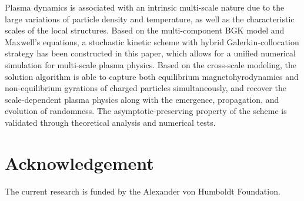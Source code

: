 \documentclass[preprint,3p,12pt,sort&compress]{elsarticle}
\begin{document}
Plasma dynamics is associated with an intrinsic multi-scale nature due to the large variations of particle density and temperature, as well as the characteristic scales of the local structures. 
Based on the multi-component BGK model and Maxwell's equations, a stochastic kinetic scheme with hybrid Galerkin-collocation strategy has been constructed in this paper, which allows for a unified numerical simulation for multi-scale plasma physics. 
Based on the cross-scale modeling, the solution algorithm is able to capture both equilibrium magnetohyrodynamics and non-equilibrium gyrations of charged particles simultaneously, and recover the scale-dependent plasma physics along with the emergence, propagation, and evolution of randomness. 
The asymptotic-preserving property of the scheme is validated through theoretical analysis and numerical tests.

\section*{Acknowledgement}

The current research is funded by the Alexander von Humboldt Foundation.

\clearpage
\newpage



\newpage
\end{document}
